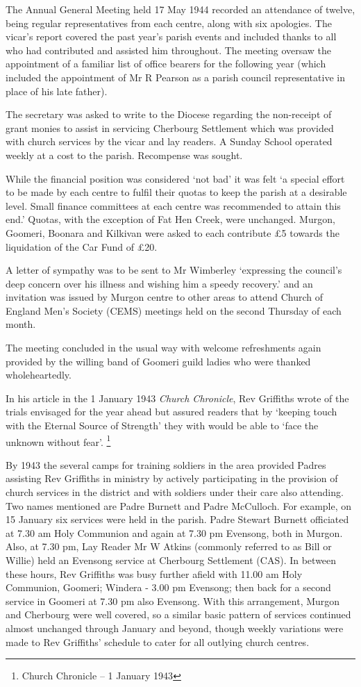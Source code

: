 The Annual General Meeting held 17 May 1944 recorded an attendance of twelve, being regular representatives from each centre, along with six apologies. The vicar's report covered the past year's parish events and included thanks to all who had contributed and assisted him throughout. The meeting oversaw the appointment of a familiar list of office bearers for the following year (which included the appointment of Mr R Pearson as a parish council representative in place of his late father).

The secretary was asked to write to the Diocese regarding the non-receipt of grant monies to assist in servicing Cherbourg Settlement which was provided with church services by the vicar and lay readers. A Sunday School operated weekly at a cost to the parish. Recompense was sought.

While the financial position was considered `not bad' it was felt `a special effort to be made by each centre to fulfil their quotas to keep the parish at a desirable level. Small finance committees at each centre was recommended to attain this end.' Quotas, with the exception of Fat Hen Creek, were unchanged. Murgon, Goomeri, Boonara and Kilkivan were asked to each contribute £5 towards the liquidation of the Car Fund of £20.

A letter of sympathy was to be sent to Mr Wimberley `expressing the council's deep concern over his illness and wishing him a speedy recovery.' and an invitation was issued by Murgon centre to other areas to attend Church of England Men's Society (CEMS) meetings held on the second Thursday of each month.

The meeting concluded in the usual way with welcome refreshments again provided by the willing band of Goomeri guild ladies who were thanked wholeheartedly.

In his article in the 1 January 1943 \emph{Church Chronicle}, Rev Griffiths wrote of the trials envisaged for the year ahead but assured readers that by `keeping touch with the Eternal Source of Strength' they with would be able to `face the unknown without fear'. \footnote{Church Chronicle -- 1 January 1943}

By 1943 the several camps for training soldiers in the area provided Padres assisting Rev Griffiths in ministry by actively participating in the provision of church services in the district and with soldiers under their care also attending. Two names mentioned are Padre Burnett and Padre McCulloch. For example, on 15 January six services were held in the parish. Padre Stewart Burnett officiated at 7.30 am Holy Communion and again at 7.30 pm Evensong, both in Murgon. Also, at 7.30 pm, Lay Reader Mr W Atkins (commonly referred to as Bill or Willie) held an Evensong service at Cherbourg Settlement (CAS). In between these hours, Rev Griffiths was busy further afield with 11.00 am Holy Communion, Goomeri; Windera - 3.00 pm Evensong; then back for a second service in Goomeri at 7.30 pm also Evensong. With this arrangement, Murgon and Cherbourg were well covered, so a similar basic pattern of services continued almost unchanged through January and beyond, though weekly variations were made to Rev Griffiths' schedule to cater for all outlying church centres.

